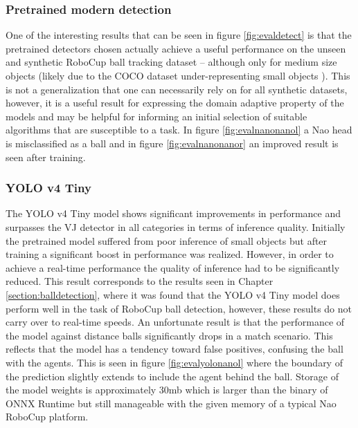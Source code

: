 \documentclass[a4paper,twoside,12pt]{report}
\begin{document}
\subsubsection{Pretrained modern detection}

One of the interesting results that can be seen in figure \ref{fig:evaldetect} is that the pretrained detectors chosen actually achieve a useful performance on the unseen and synthetic RoboCup ball tracking dataset -- although only for medium size objects (likely due to the COCO dataset under-representing small objects \citep{smallcoco}). This is not a generalization that one can necessarily rely on for all synthetic datasets, however, it is a useful result for expressing the domain adaptive property of the models and may be helpful for informing an initial selection of suitable algorithms that are susceptible to a task. In figure \ref{fig:evalnanonanol} a Nao head is misclassified as a ball and in figure \ref{fig:evalnanonanor} an improved result is seen after training.

\subsubsection{YOLO v4 Tiny}

The YOLO v4 Tiny model shows significant improvements in performance and surpasses the VJ detector in all categories in terms of inference quality. Initially the pretrained model suffered from poor inference of small objects but after training a significant boost in performance was realized. However, in order to achieve a real-time performance the quality of inference had to be significantly reduced. This result corresponds to the results seen in Chapter \ref{section:balldetection}, where it was found that the YOLO v4 Tiny model does perform well in the task of RoboCup ball detection, however, these results do not carry over to real-time speeds. An unfortunate result is that the performance of the model against distance balls significantly drops in a match scenario. This reflects that the model has a tendency toward false positives, confusing the ball with the agents. This is seen in figure \ref{fig:evalyolonanol} where the boundary of the prediction slightly extends to include the agent behind the ball. Storage of the model weights is approximately 30mb which is larger than the binary of ONNX Runtime but still manageable with the given memory of a typical Nao RoboCup platform.
\end{document}
